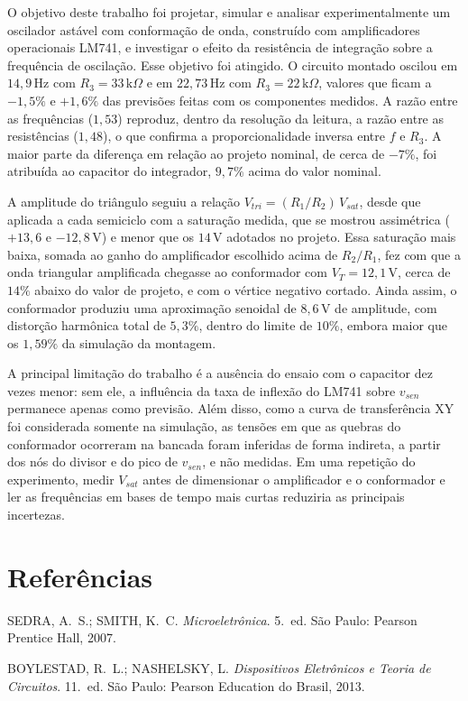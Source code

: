 \documentclass[11pt,a4paper]{article}
\begin{document}

O objetivo deste trabalho foi projetar, simular e analisar experimentalmente um oscilador astável com conformação de onda, construído com amplificadores operacionais LM741, e investigar o efeito da resistência de integração sobre a frequência de oscilação. Esse objetivo foi atingido. O circuito montado oscilou em $14{,}9\,\text{Hz}$ com $R_3 = 33\,\text{k}\Omega$ e em $22{,}73\,\text{Hz}$ com $R_3 = 22\,\text{k}\Omega$, valores que ficam a $-1{,}5\%$ e $+1{,}6\%$ das previsões feitas com os componentes medidos. A razão entre as frequências ($1{,}53$) reproduz, dentro da resolução da leitura, a razão entre as resistências ($1{,}48$), o que confirma a proporcionalidade inversa entre $f$ e $R_3$. A maior parte da diferença em relação ao projeto nominal, de cerca de $-7\%$, foi atribuída ao capacitor do integrador, $9{,}7\%$ acima do valor nominal.

A amplitude do triângulo seguiu a relação $V_{tri} = (R_1/R_2)\,V_{sat}$, desde que aplicada a cada semiciclo com a saturação medida, que se mostrou assimétrica ($+13{,}6$ e $-12{,}8\,\text{V}$) e menor que os $14\,\text{V}$ adotados no projeto. Essa saturação mais baixa, somada ao ganho do amplificador escolhido acima de $R_2/R_1$, fez com que a onda triangular amplificada chegasse ao conformador com $V_T = 12{,}1\,\text{V}$, cerca de $14\%$ abaixo do valor de projeto, e com o vértice negativo cortado. Ainda assim, o conformador produziu uma aproximação senoidal de $8{,}6\,\text{V}$ de amplitude, com distorção harmônica total de $5{,}3\%$, dentro do limite de $10\%$, embora maior que os $1{,}59\%$ da simulação da montagem.

A principal limitação do trabalho é a ausência do ensaio com o capacitor dez vezes menor: sem ele, a influência da taxa de inflexão do LM741 sobre $v_{sen}$ permanece apenas como previsão. Além disso, como a curva de transferência XY foi considerada somente na simulação, as tensões em que as quebras do conformador ocorreram na bancada foram inferidas de forma indireta, a partir dos nós do divisor e do pico de $v_{sen}$, e não medidas. Em uma repetição do experimento, medir $V_{sat}$ antes de dimensionar o amplificador e o conformador e ler as frequências em bases de tempo mais curtas reduziria as principais incertezas.

\section{Referências}

\begin{referencias}
\item SEDRA, A.~S.; SMITH, K.~C. \emph{Microeletrônica}. 5.~ed. São Paulo: Pearson
      Prentice Hall, 2007.
\item BOYLESTAD, R.~L.; NASHELSKY, L. \emph{Dispositivos Eletrônicos e Teoria de
      Circuitos}. 11.~ed. São Paulo: Pearson Education do Brasil, 2013.
\end{referencias}
\end{document}
